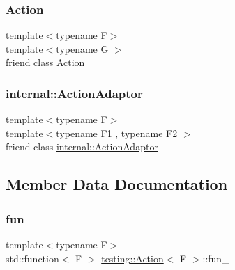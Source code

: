 \subsubsection{\texorpdfstring{Action}{Action}}
{\footnotesize\ttfamily template$<$typename F$>$ \\
template$<$typename G $>$ \\
friend class \mbox{\hyperlink{classtesting_1_1_action}{Action}}\hspace{0.3cm}{\ttfamily [friend]}}

\mbox{\label{classtesting_1_1_action_a66fe4f9c9b9d020273151aa6054b491e}} 
\subsubsection{\texorpdfstring{internal::ActionAdaptor}{internal::ActionAdaptor}}
{\footnotesize\ttfamily template$<$typename F$>$ \\
template$<$typename F1 , typename F2 $>$ \\
friend class \mbox{\hyperlink{classtesting_1_1internal_1_1_action_adaptor}{internal\+::\+Action\+Adaptor}}\hspace{0.3cm}{\ttfamily [friend]}}



\subsection{Member Data Documentation}
\mbox{\label{classtesting_1_1_action_a1a36719e31be47cc59d26724ad75d886}} 
\subsubsection{\texorpdfstring{fun\_}{fun\_}}
{\footnotesize\ttfamily template$<$typename F$>$ \\
std\+::function$<$ F $>$ \mbox{\hyperlink{classtesting_1_1_action}{testing\+::\+Action}}$<$ F $>$\+::fun\+\_\+\hspace{0.3cm}{\ttfamily [private]}}

